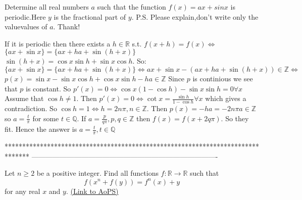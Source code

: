 \begin{solution}
	\begin{tcolorbox}Determine all real numbers $ a$ such that the function $ f(x) =${$ ax + sinx$}  is periodic.Here {$ y$} is the fractional part of $ y$.
P.S. Please explain,don't write only the value\/values of $ a$. Thank!\end{tcolorbox}
If it is periodic then there exists a $ h \in \mathbb{R}$ s.t. $ f(x+h) = f(x) \iff$
$ \{ax+\sin x\} = \{ax+ha+\sin(h+x) \}$
$ \sin (h+x) = \cos x \sin h + \sin x \cos h$.
So: $ \{ax+\sin x\} = \{ax+ha+\sin(h+x) \} \iff ax+\sin x - (ax+ha+\sin(h+x)) \in \mathbb{Z} \iff$
$ p(x) = \sin x - \sin x \cos h + \cos x \sin h  - ha \in \mathbb{Z}$
Since $ p$ is continious we see that $ p$ is constant. 
So $ p'(x) = 0 \iff \cos x ( 1 - \cos h) - \sin x \sin h = 0 \forall x$
Assume that $ \cos h \neq 1$. Then $ p'(x) = 0 \iff \cot x = \frac{\sin h}{1-\cos h} \forall x$ which gives a contradiction. So $ \cos h = 1 \iff h = 2n\pi, n \in \mathbb{Z}$.
Then $ p(x) = -ha = -2n\pi a \in \mathbb{Z}$ so $ a = \frac{t}{\pi}$ for some $ t \in \mathbb{Q}$.
If $ a = \frac{p}{q\pi}, p,q \in \mathbb{Z}$ then $ f(x) = f(x+2q\pi)$. So they fit. Hence the answer is $ a = \frac{t}{\pi},t \in \mathbb{Q}$
\end{solution}
*******************************************************************************
-------------------------------------------------------------------------------

\begin{problem}
	Let $n \geq 2$ be a positive integer. Find all functions $f: \mathbb R \to \mathbb R$ such that
\[f(x^n + f(y)) = f^n(x) + y\]
for any real $x$ and $y$.
	\flushright \href{https://artofproblemsolving.com/community/c6h307854}{(Link to AoPS)}
\end{problem}



